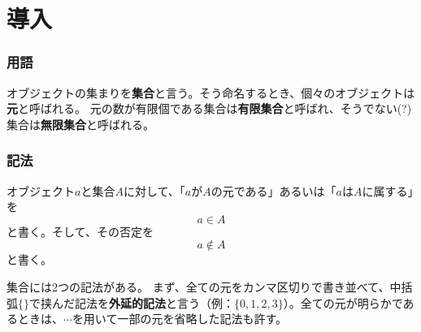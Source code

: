 \documentclass[../main]{subfiles}
\begin{document}
\part{導入}
\section{用語}
オブジェクトの集まりを\textbf{集合}と言う。そう命名するとき、個々のオブジェクトは\textbf{元}と呼ばれる。
元の数が有限個である集合は\textbf{有限集合}と呼ばれ、そうでない(?)集合は\textbf{無限集合}と呼ばれる。

\section{記法}
オブジェクト$a$と集合$A$に対して、「$a$が$A$の元である」あるいは「$a$は$A$に属する」を
\[
    a \in A
\]
と書く。そして、その否定を
\[
    a \notin A
\]
と書く。

集合には2つの記法がある。
まず、全ての元をカンマ区切りで書き並べて、中括弧$\{\}$で挟んだ記法を\textbf{外延的記法}と言う（例：$\{0, 1, 2, 3\}$）。全ての元が明らかであるときは、$\cdots$を用いて一部の元を省略した記法も許す。
\end{document}

